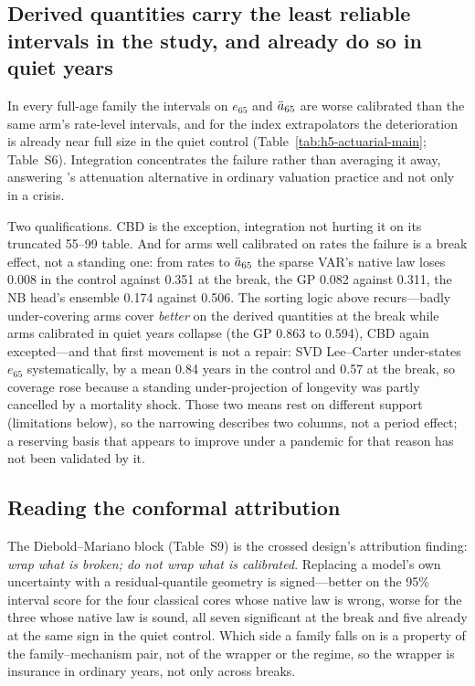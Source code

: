 \subsection{Derived quantities carry the least reliable intervals in the study, and already do so in quiet years}
\label{sec:discussion-derived}

In every full-age family the intervals on $e_{65}$ and $\ddot{a}_{65}$ are worse
calibrated than the same arm's rate-level intervals, and for the index
extrapolators the deterioration is already near full size in the quiet control
(Table~\ref{tab:h5-actuarial-main}; Table~S6). Integration concentrates the
failure rather than averaging it away, answering \citet{cairns2011mortality}'s
attenuation alternative in ordinary valuation practice and not only in a
crisis.

Two qualifications. CBD is the exception, integration not hurting it on its
truncated 55--99 table. And for arms well calibrated on rates the failure is a
break effect, not a standing one: from rates to $\ddot{a}_{65}$ the sparse VAR's
native law loses 0.008 in the control against 0.351 at the break, the GP 0.082
against 0.311, the NB head's ensemble 0.174 against 0.506. The sorting logic
above recurs---badly under-covering arms cover \emph{better} on the derived
quantities at the break while arms calibrated in quiet years collapse (the GP
0.863 to 0.594), CBD again excepted---and that first movement is not a repair:
SVD Lee--Carter under-states $e_{65}$ systematically, by a mean 0.84 years in
the control and 0.57 at the break, so coverage rose because a standing
under-projection of longevity was partly cancelled by a mortality shock. Those
two means rest on different support (limitations below), so the narrowing
describes two columns, not a period effect; a reserving basis that appears to
improve under a pandemic for that reason has not been validated by it.

\subsection{Reading the conformal attribution}
\label{sec:discussion-conformal}

The Diebold--Mariano block (Table~S9) is the crossed design's attribution
finding: \emph{wrap what is broken; do not wrap what is calibrated}. Replacing
a model's own uncertainty with a residual-quantile geometry is signed---better
on the 95\% interval score for the four classical cores whose native law is
wrong, worse for the three whose native law is sound, all seven significant at
the break and five already at the same sign in the quiet control. Which side a
family falls on is a property of the family--mechanism pair, not of the wrapper
or the regime, so the wrapper is insurance in ordinary years, not only across
breaks.

